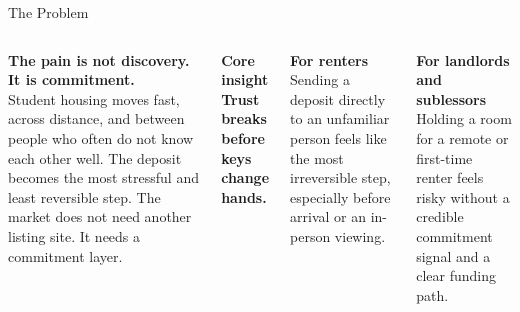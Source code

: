 \documentclass[10pt,aspectratio=169]{beamer}
\newcommand{\infocard}[2]{%
\begin{tcolorbox}[pitchcard]
{\normalsize\bfseries #1}\\[0.8mm]
{\footnotesize\color{muted} #2}
\end{tcolorbox}
}
\begin{document}
\begin{frame}[shrink=5]{The Problem}
\begin{columns}[T,totalwidth=\textwidth]
{\Large\bfseries The pain is not discovery. It is commitment.}\\[4mm]
{\footnotesize\color{muted} Student housing moves fast, across distance, and between people who often do not know each other well. The deposit becomes the most stressful and least reversible step. The market does not need another listing site. It needs a commitment layer.}\\[5mm]

\begin{tcolorbox}[darkcard]
{\footnotesize\bfseries\textcolor{white!68}{Core insight}}\\[2mm]
{\Large\bfseries Trust breaks before keys change hands.}
\end{tcolorbox}

\infocard{For renters}{Sending a deposit directly to an unfamiliar person feels like the most irreversible step, especially before arrival or an in-person viewing.}
\vspace{1.8mm}
\infocard{For landlords and sublessors}{Holding a room for a remote or first-time renter feels risky without a credible commitment signal and a clear funding path.}
\end{columns}
\end{frame}
\end{document}
